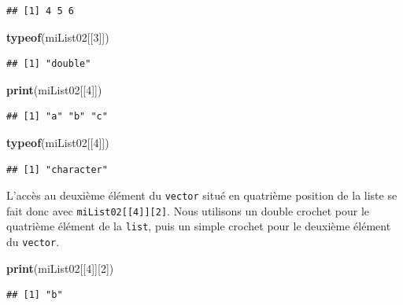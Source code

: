 \documentclass[twoside,symmetric]{book}
\newenvironment{Shaded}{}{}
\newcommand{\DecValTok}[1]{#1}
\newcommand{\KeywordTok}[1]{\textbf{#1}}
\newcommand{\NormalTok}[1]{#1}
\begin{document}
\begin{verbatim}
## [1] 4 5 6
\end{verbatim}

\begin{Shaded}
\begin{Highlighting}[]
\KeywordTok{typeof}\NormalTok{(miList02[[}\DecValTok{3}\NormalTok{]])}
\end{Highlighting}
\end{Shaded}

\begin{verbatim}
## [1] "double"
\end{verbatim}

\begin{Shaded}
\begin{Highlighting}[]
\KeywordTok{print}\NormalTok{(miList02[[}\DecValTok{4}\NormalTok{]])}
\end{Highlighting}
\end{Shaded}

\begin{verbatim}
## [1] "a" "b" "c"
\end{verbatim}

\begin{Shaded}
\begin{Highlighting}[]
\KeywordTok{typeof}\NormalTok{(miList02[[}\DecValTok{4}\NormalTok{]])}
\end{Highlighting}
\end{Shaded}

\begin{verbatim}
## [1] "character"
\end{verbatim}

L'accès au deuxième élément du \texttt{vector} situé en quatrième position de la liste se fait donc avec \texttt{miList02{[}{[}4{]}{]}{[}2{]}}. Nous utilisons un double crochet pour le quatrième élément de la \texttt{list}, puis un simple crochet pour le deuxième élément du \texttt{vector}.

\begin{Shaded}
\begin{Highlighting}[]
\KeywordTok{print}\NormalTok{(miList02[[}\DecValTok{4}\NormalTok{]][}\DecValTok{2}\NormalTok{])}
\end{Highlighting}
\end{Shaded}

\begin{verbatim}
## [1] "b"
\end{verbatim}
\end{document}
